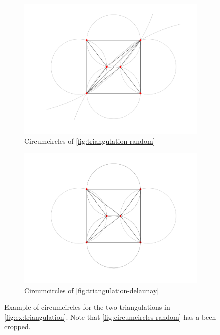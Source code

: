 \begin{figure}[ht]
    \centering
    \begin{subfigure}[b]{0.4\textwidth}
        \centering
        \includegraphics[width=\textwidth]{report/Images/Theory/circumcircles/circumcircle_random.png}
        \caption{Circumcircles of \autoref{fig:triangulation-random}}
        \label{fig:circumcircles-random}
    \end{subfigure}
    \begin{subfigure}[b]{0.4\textwidth}
        \centering
        \includegraphics[width=\textwidth]{report/Images/Theory/circumcircles/circumcircle_delaunay.png}
        \caption{Circumcircles of \autoref{fig:triangulation-delaunay}}
        \label{fig:circumcircles-delaunay}
    \end{subfigure}
    \caption[Example of circumcircles]{Example of circumcircles for the two triangulations in \autoref{fig:ex:triangulation}. Note that \autoref{fig:circumcircles-random} has a been cropped.}
    \label{fig:ex:circumcircles}
\end{figure}


